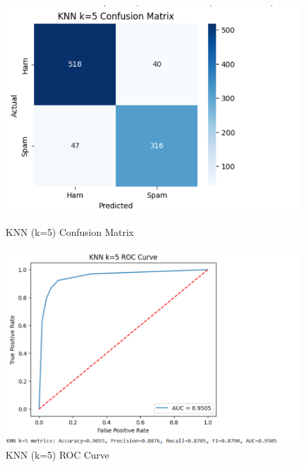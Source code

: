 \documentclass[12pt]{article}
\begin{document}
\begin{figure}[H]
\centering
\begin{minipage}{0.45\textwidth}
\centering
\includegraphics[width=\linewidth]{16.png}
\caption{KNN (k=5) Confusion Matrix}
\end{minipage}
\hfill
\begin{minipage}{0.45\textwidth}
\centering
\includegraphics[width=\linewidth]{17.png}
\caption{KNN (k=5) ROC Curve}
\end{minipage}
\end{figure}
\end{document}
